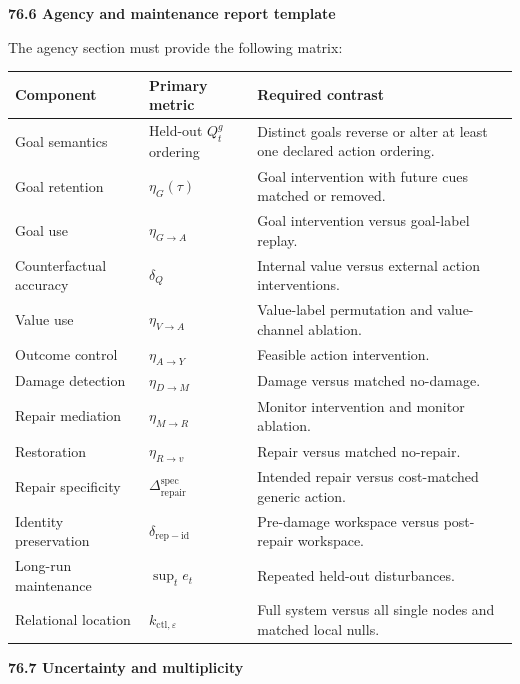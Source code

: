 \documentclass[11pt,letterpaper]{article}
\newcommand{\subtopic}[1]{%
 \vspace{0.45em}
 {\bfseries\color{AccentColor} #1\par}
}
\theoremstyle{plain}
\theoremstyle{definition}
\begin{document}
\subtopic{76.6 Agency and maintenance report template}

The agency section must provide the following matrix:

\begin{center}
\small
\begin{tabularx}{\textwidth}{@{}p{}p{}X@{}}
\toprule
Component & Primary metric & Required contrast \\
\midrule
Goal semantics & Held-out \(Q_t^g\) ordering & Distinct goals reverse or alter
at least one declared action ordering. \\
Goal retention & \(\eta_G(\tau)\) & Goal intervention with future cues matched
or removed. \\
Goal use & \(\eta_{G\to A}\) & Goal intervention versus goal-label replay. \\
Counterfactual accuracy & \(\delta_Q\) & Internal value versus external action
interventions. \\
Value use & \(\eta_{V\to A}\) & Value-label permutation and value-channel
ablation. \\
Outcome control & \(\eta_{A\to Y}\) & Feasible action intervention. \\
Damage detection & \(\eta_{D\to M}\) & Damage versus matched no-damage. \\
Repair mediation & \(\eta_{M\to R}\) & Monitor intervention and monitor
ablation. \\
Restoration & \(\eta_{R\to v}\) & Repair versus matched no-repair. \\
Repair specificity & \(\Delta_{\mathrm{repair}}^{\mathrm{spec}}\) & Intended
repair versus cost-matched generic action. \\
Identity preservation & \(\delta_{\mathrm{rep-id}}\) & Pre-damage workspace
versus post-repair workspace. \\
Long-run maintenance & \(\sup_t e_t\) & Repeated held-out disturbances. \\
Relational location & \(k_{\mathrm{ctl},\varepsilon}\) & Full system versus
all single nodes and matched local nulls. \\
\bottomrule
\end{tabularx}
\end{center}

\subtopic{76.7 Uncertainty and multiplicity}
\end{document}
